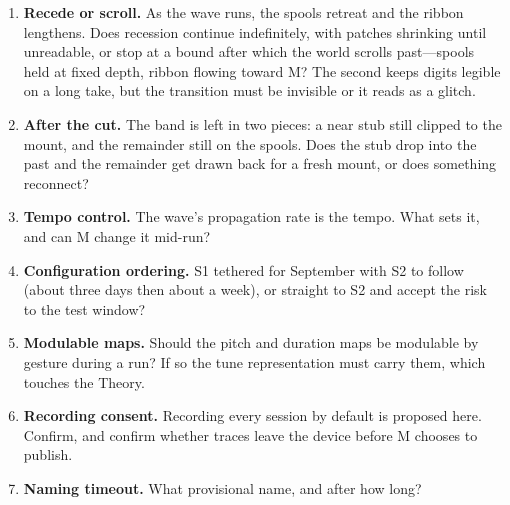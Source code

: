 \documentclass[11pt,a4paper]{article}
\theoremstyle{definition}
\theoremstyle{plain}
\theoremstyle{remark}
\begin{document}
\begin{enumerate}[leftmargin=*,itemsep=0.4em]
\item \textbf{Recede or scroll.} As the wave runs, the spools retreat and the ribbon lengthens. Does
      recession continue indefinitely, with patches shrinking until unreadable, or stop at a bound
      after which the world scrolls past---spools held at fixed depth, ribbon flowing toward M? The
      second keeps digits legible on a long take, but the transition must be invisible or it reads
      as a glitch.
\item \textbf{After the cut.} The band is left in two pieces: a near stub still clipped to the
      mount, and the remainder still on the spools. Does the stub drop into the past and the
      remainder get drawn back for a fresh mount, or does something reconnect?
\item \textbf{Tempo control.} The wave's propagation rate is the tempo. What sets it, and can M
      change it mid-run?
\item \textbf{Configuration ordering.} S1 tethered for September with S2 to follow (about three days
      then about a week), or straight to S2 and accept the risk to the test window?
\item \textbf{Modulable maps.} Should the pitch and duration maps be modulable by gesture
      during a run? If so the tune representation must carry them, which touches the Theory.
\item \textbf{Recording consent.} Recording every session by default is proposed here. Confirm, and
      confirm whether traces leave the device before M chooses to publish.
\item \textbf{Naming timeout.} What provisional name, and after how long?
\end{enumerate}
\end{document}
